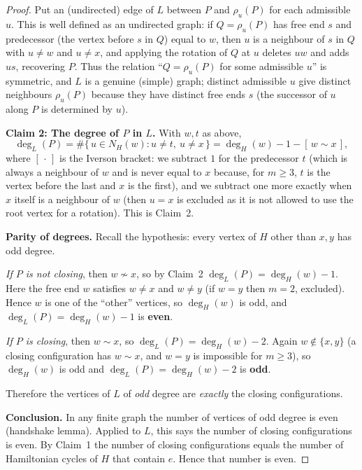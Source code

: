 \documentclass{amsart}
\theoremstyle{plain}
\theoremstyle{definition}
\begin{document}
\begin{proof}
Put an (undirected) edge of $L$ between $P$ and $\rho_u(P)$ for each admissible
$u$.  This is well defined as an undirected graph: if $Q=\rho_u(P)$ has free end
$s$ and predecessor (the vertex before $s$ in $Q$) equal to $w$, then $u$ is a
neighbour of $s$ in $Q$ with $u\neq w$ and $u\neq x$, and applying the rotation
of $Q$ at $u$ deletes $uw$ and adds $us$, recovering $P$.  Thus the relation
``$Q=\rho_u(P)$ for some admissible $u$'' is symmetric, and $L$ is a genuine
(simple) graph; distinct admissible $u$ give distinct neighbours $\rho_u(P)$
because they have distinct free ends $s$ (the successor of $u$ along $P$ is
determined by $u$).

\medskip
\noindent\textbf{Claim 2: The degree of $P$ in $L$.}
With $w,t$ as above,
\[
\deg_L(P)=\#\{\,u\in N_H(w): u\neq t,\ u\neq x\,\}
=\deg_H(w)-1-[\,w\sim x\,],
\]
where $[\,\cdot\,]$ is the Iverson bracket: we subtract $1$ for the predecessor
$t$ (which is always a neighbour of $w$ and is never equal to $x$ because, for
$m\ge 3$, $t$ is the vertex before the last and $x$ is the first), and we
subtract one more exactly when $x$ itself is a neighbour of $w$ (then $u=x$ is
excluded as it is not allowed to use the root vertex for a rotation).  This is
Claim~2.

\medskip
\noindent\textbf{Parity of degrees.}
Recall the hypothesis: every vertex of $H$ other than $x,y$ has odd degree.

\emph{If $P$ is not closing}, then $w\not\sim x$, so by Claim~2
$\deg_L(P)=\deg_H(w)-1$.  Here the free end $w$ satisfies $w\neq x$ and $w\neq y$
(if $w=y$ then $m=2$, excluded).  Hence $w$ is one of the ``other'' vertices, so
$\deg_H(w)$ is odd, and $\deg_L(P)=\deg_H(w)-1$ is \textbf{even}.

\emph{If $P$ is closing}, then $w\sim x$, so $\deg_L(P)=\deg_H(w)-2$.  Again
$w\notin\{x,y\}$ (a closing configuration has $w\sim x$, and $w=y$ is impossible
for $m\ge3$), so $\deg_H(w)$ is odd and $\deg_L(P)=\deg_H(w)-2$ is \textbf{odd}.

Therefore the vertices of $L$ of \emph{odd} degree are \emph{exactly} the closing
configurations.

\medskip
\noindent\textbf{Conclusion.}
In any finite graph the number of vertices of odd degree is even (handshake
lemma).  Applied to $L$, this says the number of closing configurations is even.
By Claim~1 the number of closing configurations equals the number of Hamiltonian
cycles of $H$ that contain $e$.  Hence that number is even.
\end{proof}
\end{document}

